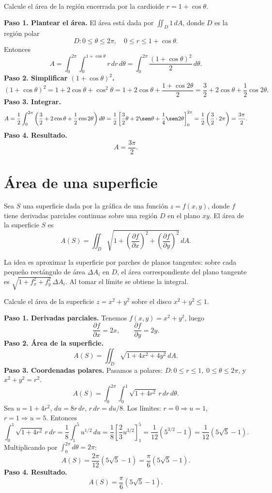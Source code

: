 \begin{example}
Calcule el área de la región encerrada por la cardioide \(r=1+\cos\theta\).
\begin{myproof}
\textbf{Paso 1. Plantear el área.} El área está dada por \(\iint_D 1\,dA\), donde \(D\) es la región polar
\[
D: 0\le \theta\le 2\pi,\quad 0\le r\le 1+\cos\theta.
\]
Entonces
\[
A = \int_0^{2\pi}\int_0^{1+\cos\theta} r\,dr\,d\theta
= \int_0^{2\pi} \frac{(1+\cos\theta)^2}{2}\,d\theta.
\]
\textbf{Paso 2. Simplificar $(1+\cos\theta)^2$.}
\[
(1+\cos\theta)^2 = 1+2\cos\theta+\cos^2\theta = 1+2\cos\theta+\frac{1+\cos2\theta}{2}
= \frac{3}{2}+2\cos\theta+\frac{1}{2}\cos2\theta.
\]
\textbf{Paso 3. Integrar.}
\[
A = \frac{1}{2}\int_0^{2\pi}\left(\frac{3}{2}+2\cos\theta+\frac{1}{2}\cos2\theta\right)d\theta
= \frac{1}{2}\left[\frac{3}{2}\theta+2\sen\theta+\frac{1}{4}\sen2\theta\right]_0^{2\pi}
= \frac{1}{2}\left(\frac{3}{2}\cdot 2\pi\right)
= \frac{3\pi}{2}.
\]
\textbf{Paso 4. Resultado.}
\[
\boxed{A=\frac{3\pi}{2}.}
\]
\end{myproof}
\end{example}

\section{Área de una superficie}

Sea \(S\) una superficie dada por la gráfica de una función \(z=f(x,y)\), donde \(f\) tiene derivadas parciales continuas sobre una región \(D\) en el plano \(xy\). El área de la superficie \(S\) es
\[
A(S) = \iint_D \sqrt{1+\left(\frac{\partial f}{\partial x}\right)^2+\left(\frac{\partial f}{\partial y}\right)^2}\,dA.
\]

La idea es aproximar la superficie por parches de planos tangentes: sobre cada pequeño rectángulo de área \(\Delta A_i\) en \(D\), el área correspondiente del plano tangente es \(\sqrt{1+f_x^2+f_y^2}\,\Delta A_i\). Al tomar el límite se obtiene la integral.

\begin{example}
Calcule el área de la superficie \(z=x^2+y^2\) sobre el disco \(x^2+y^2\le 1\).
\begin{myproof}
\textbf{Paso 1. Derivadas parciales.} Tenemos \(f(x,y)=x^2+y^2\), luego
\[
\frac{\partial f}{\partial x}=2x,\qquad \frac{\partial f}{\partial y}=2y.
\]
\textbf{Paso 2. Área de la superficie.}
\[
A(S)=\iint_D \sqrt{1+4x^2+4y^2}\,dA.
\]
\textbf{Paso 3. Coordenadas polares.} Pasamos a polares: \(D:0\le r\le1,\;0\le\theta\le2\pi\), y \(x^2+y^2=r^2\).
\[
A(S)=\int_0^{2\pi}\int_0^1 \sqrt{1+4r^2}\,r\,dr\,d\theta.
\]
Sea \(u=1+4r^2\), \(du=8r\,dr\), \(r\,dr=du/8\). Los límites: \(r=0\Rightarrow u=1\), \(r=1\Rightarrow u=5\). Entonces
\[
\int_0^1 \sqrt{1+4r^2}\,r\,dr = \frac{1}{8}\int_1^5 u^{1/2}\,du
= \frac{1}{8}\left[\frac{2}{3}u^{3/2}\right]_1^5
= \frac{1}{12}(5^{3/2}-1) = \frac{1}{12}(5\sqrt5-1).
\]
Multiplicando por \(\int_0^{2\pi}d\theta=2\pi\):
\[
A(S)= \frac{2\pi}{12}(5\sqrt5-1) = \frac{\pi}{6}(5\sqrt5-1).
\]
\textbf{Paso 4. Resultado.}
\[
\boxed{A(S)=\frac{\pi}{6}(5\sqrt5-1).}
\]
\end{myproof}
\end{example}

